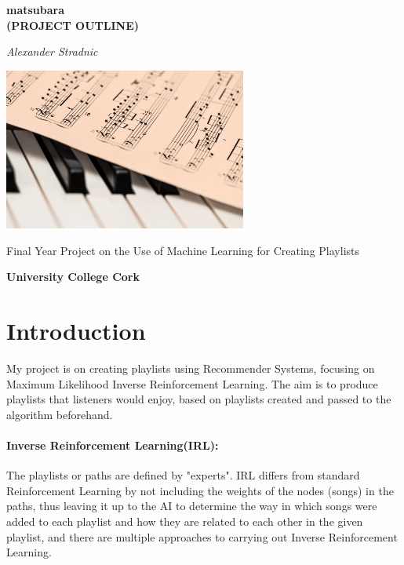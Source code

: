 \documentclass[a4paper, 12pt]{article}
\begin{document}
\begin{titlepage}
    \begin{center}
        \vspace*{1cm}

        \huge
        \textbf{matsubara\\ (PROJECT OUTLINE)}

        \vspace{1cm}

        \textit{Alexander Stradnic}

        \vspace{3cm}

        \includegraphics[width=0.6\textwidth]{"piano.jpg"}

        \vfill

        \textsf{Final Year Project on the Use of Machine Learning for Creating Playlists}

        \vspace{1cm}

        \textbf{University College Cork}

        \vspace*{1cm}

    \end{center}
\end{titlepage}

\section{Introduction}
My project is on creating playlists using Recommender Systems, focusing on Maximum Likelihood Inverse Reinforcement Learning.
The aim is to produce playlists that listeners would enjoy, based on playlists created and passed to the algorithm beforehand.

\paragraph{Inverse Reinforcement Learning(IRL):}
The playlists or paths are defined by "experts".
IRL differs from standard Reinforcement Learning by not including the weights of the nodes (songs) in the paths, thus leaving it up to the AI to determine the way in which songs were added to each playlist and how they are related to each other in the given playlist, and there are multiple approaches to carrying out Inverse Reinforcement Learning.
\end{document}
